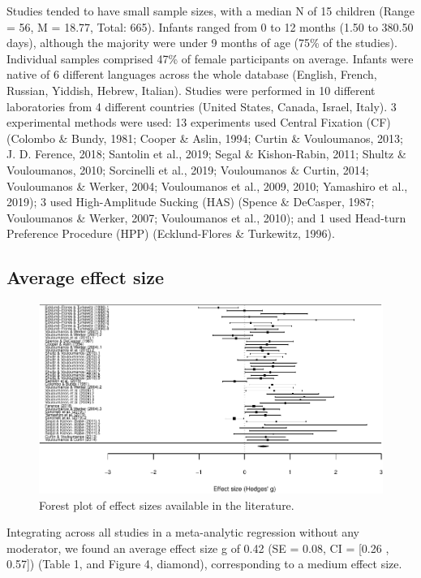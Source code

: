 \documentclass[man]{apa6}
\begin{document}
Studies tended to have small sample sizes, with a median N of 15
children (Range = 56, M = 18.77, Total: 665). Infants ranged from 0 to
12 months (1.50 to 380.50 days), although the majority were under 9
months of age (75\% of the studies). Individual samples comprised 47\%
of female participants on average. Infants were native of 6 different
languages across the whole database (English, French, Russian, Yiddish,
Hebrew, Italian). Studies were performed in 10 different laboratories
from 4 different countries (United States, Canada, Israel, Italy). 3
experimental methods were used: 13 experiments used Central Fixation
(CF) (Colombo \& Bundy, 1981; Cooper \& Aslin, 1994; Curtin \&
Vouloumanos, 2013; J. D. Ference, 2018; Santolin et al., 2019; Segal \&
Kishon-Rabin, 2011; Shultz \& Vouloumanos, 2010; Sorcinelli et al.,
2019; Vouloumanos \& Curtin, 2014; Vouloumanos \& Werker, 2004;
Vouloumanos et al., 2009, 2010; Yamashiro et al., 2019); 3 used
High-Amplitude Sucking (HAS) (Spence \& DeCasper, 1987; Vouloumanos \&
Werker, 2007; Vouloumanos et al., 2010); and 1 used Head-turn Preference
Procedure (HPP) (Ecklund-Flores \& Turkewitz, 1996).

\subsection{Average effect size}\label{average-effect-size}

\begin{figure}
\centering
\includegraphics{MA_speech_pref_files/figure-latex/forest-1.pdf}
\caption{\label{fig:forest}Forest plot of effect sizes available in the
literature.}
\end{figure}

Integrating across all studies in a meta-analytic regression without any
moderator, we found an average effect size g of 0.42 (SE = 0.08, CI =
{[}0.26 , 0.57{]}) (Table 1, and Figure 4, diamond), corresponding to a
medium effect size.
\end{document}

